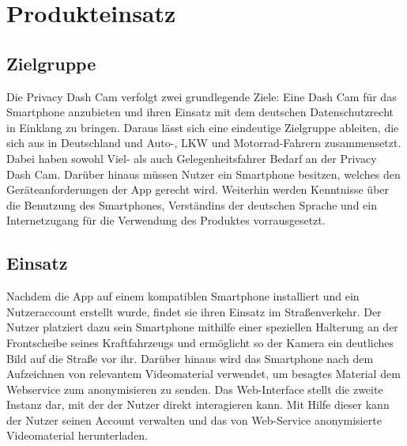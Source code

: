 \chapter{Produkteinsatz}

\section{Zielgruppe}
Die Privacy Dash Cam verfolgt zwei grundlegende Ziele: Eine Dash Cam für das Smartphone anzubieten und ihren Einsatz mit dem deutschen Datenschutzrecht in Einklang zu bringen. Daraus lässt sich eine eindeutige Zielgruppe ableiten, die sich aus in Deutschland und Auto-, LKW und Motorrad-Fahrern zusammensetzt. Dabei haben sowohl Viel- als auch Gelegenheitsfahrer Bedarf an der Privacy Dash Cam. Darüber hinaus müssen Nutzer ein Smartphone besitzen, welches den Geräteanforderungen der App gerecht wird. Weiterhin werden Kenntnisse über die Benutzung des Smartphones, Verständins der deutschen Sprache und ein Internetzugang für die Verwendung des Produktes vorrausgesetzt.

\section{Einsatz}
Nachdem die App auf einem kompatiblen Smartphone installiert und ein Nutzeraccount erstellt wurde, findet sie ihren Einsatz im Straßenverkehr. Der Nutzer platziert dazu sein Smartphone mithilfe einer speziellen Halterung an der Frontscheibe seines Kraftfahrzeugs und ermöglicht so der Kamera ein deutliches Bild auf die Straße vor ihr. Darüber hinaus wird das Smartphone nach dem Aufzeichnen von relevantem Videomaterial verwendet, um besagtes Material dem Webservice zum anonymisieren zu senden.\newline
Das Web-Interface stellt die zweite Instanz dar, mit der der Nutzer direkt interagieren kann. Mit Hilfe dieser kann der Nutzer seinen Account verwalten und das von Web-Service anonymisierte Videomaterial herunterladen.

